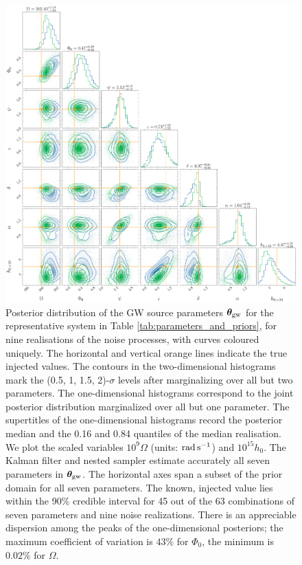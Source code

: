 \documentclass[fleqn,usenatbib,useAMS]{mnras}
\begin{document}
  

\begin{figure}
	\includegraphics[width=\textwidth, height =\textwidth ]{images/corner_lowSNR}
	\caption{Posterior distribution of the GW source parameters $\boldsymbol{\theta}_{\rm gw}$ for the representative system in Table \ref{tab:parameters_and_priors}, for nine realisations of the noise processes, with curves coloured uniquely. The horizontal and vertical orange lines indicate the true injected values. The contours in the two-dimensional histograms mark the (0.5, 1, 1.5, 2)-$\sigma$ levels after marginalizing over all but two parameters. The one-dimensional histograms correspond to the joint posterior distribution marginalized over all but one parameter. The supertitles of the one-dimensional histograms record the posterior median and the 0.16 and 0.84 quantiles of the median realisation. We plot the scaled variables $10^9 \Omega$ (units: ${\rm rad \, s^{-1}}$) and $10^{15} h_0$. The Kalman filter and nested sampler estimate accurately all seven parameters in ${\boldsymbol{\theta}}_{\rm gw}$. The horizontal axes span a subset of the prior domain for all seven parameters. The known, injected value lies within the 90\% credible interval for 45 out of the 63 combinations of seven parameters and nine noise realizations. There is an appreciable dispersion among the peaks of the one-dimensional posteriors; the maximum coefficient of variation is $43 \%$ for $\Phi_0$, the minimum is $0.02 \%$ for $\Omega$.}
	\label{fig:corner_plot_1}
\end{figure}
\end{document}
